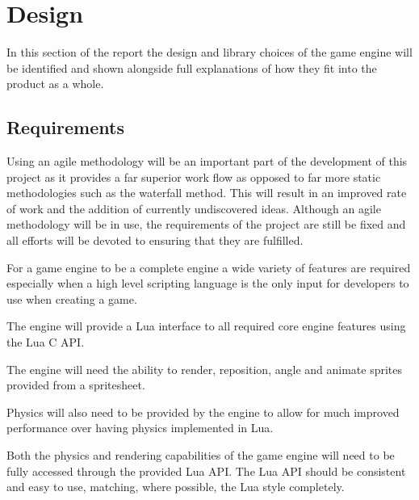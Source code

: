 \documentclass[11pt,a4paper,titlepage]{report}
\begin{document}
\chapter{Design}



	In this section of the report the design and library choices of the game engine will be identified and shown alongside full explanations of how they fit into the product as a whole.

\section{Requirements}

	Using an agile methodology will be an important part of the development of this project as it provides a far superior work flow as opposed to far more static methodologies such as the waterfall method. This will result in an improved rate of work and the addition of currently undiscovered ideas. Although an agile methodology will be in use, the requirements of the project are still be fixed and all efforts will be devoted to ensuring that they are fulfilled.


	For a game engine to be a complete engine a wide variety of features are required especially when a high level scripting language is the only input for developers to use when creating a game.

	The engine will provide a Lua interface to all required core engine features using the Lua C API.

	The engine will need the ability to render, reposition, angle and animate sprites provided from a spritesheet.

	Physics will also need to be provided by the engine to allow for much improved performance over having physics implemented in Lua.

	Both the physics and rendering capabilities of the game engine will need to be fully accessed through the provided Lua API. The Lua API should be consistent and easy to use, matching, where possible, the Lua style completely.

\end{document}
